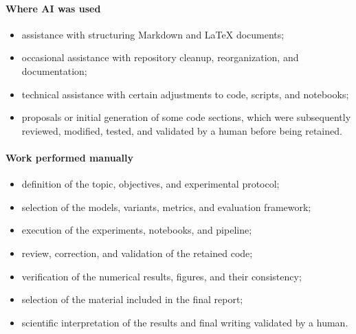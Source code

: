 \paragraph{Where AI was used}
\begin{itemize}
    \item assistance with structuring Markdown and LaTeX documents;
    \item occasional assistance with repository cleanup, reorganization, and documentation;
    \item technical assistance with certain adjustments to code, scripts, and notebooks;
    \item proposals or initial generation of some code sections, which were subsequently reviewed, modified, tested, and validated by a human before being retained.
\end{itemize}

\paragraph{Work performed manually}
\begin{itemize}
    \item definition of the topic, objectives, and experimental protocol;
    \item selection of the models, variants, metrics, and evaluation framework;
    \item execution of the experiments, notebooks, and pipeline;
    \item review, correction, and validation of the retained code;
    \item verification of the numerical results, figures, and their consistency;
    \item selection of the material included in the final report;
    \item scientific interpretation of the results and final writing validated by a human.
\end{itemize}

